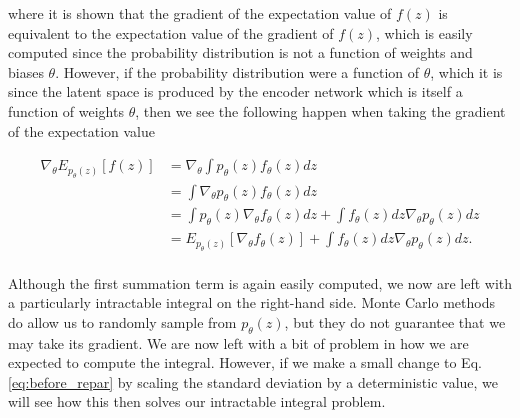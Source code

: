 where it is shown that the gradient of the expectation value 
of $f(z)$ is equivalent to the expectation value of the gradient 
of $f(z)$, which is easily computed since the probability distribution 
is not a function of weights and biases $\theta$. However, if the probability distribution 
were a function of $\theta$, which it is since the latent space is produced 
by the encoder network which is itself a function of weights $\theta$, then 
we see the following happen when taking the gradient of the 
expectation value

\begin{align}
    \nabla_{\theta} E_{p_{\theta}(z)}[f(z)] &= \nabla_{\theta} \int p_{\theta}(z) f_{\theta}(z) dz \nonumber \\
     &= \int \nabla_{\theta}  p_{\theta}(z) f_{\theta}(z) dz \nonumber \\
     &= \int  p_{\theta}(z) \nabla_{\theta} f_{\theta}(z) dz + \int  f_{\theta}(z) dz \nabla_{\theta} p_{\theta}(z) dz \nonumber \\
     &= E_{p_{\theta}(z)}[ \nabla_{\theta} f_{\theta}(z)] + \int  f_{\theta}(z) dz \nabla_{\theta} p_{\theta}(z) dz. \nonumber \\
\end{align}

Although the first summation term is again easily computed, we now are 
left with a particularly intractable integral on the right-hand side.
Monte Carlo methods do allow us to randomly sample from $p_{\theta}(z)$, but 
they do not guarantee that we may take its gradient. 
We are now left with a bit of problem in how we are expected to compute the integral.
However, if we make a small change to Eq. \ref{eq:before_repar} 
by scaling the standard deviation by a deterministic value, we will 
see how this then solves our intractable integral problem. 

